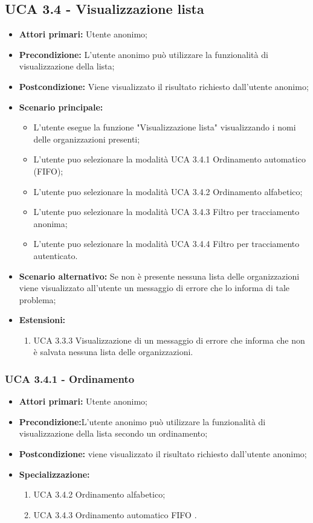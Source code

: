 \subsection{UCA 3.4 - Visualizzazione lista}%
\begin{itemize} 
	\item \textbf{Attori primari:} Utente anonimo;
	\item \textbf{Precondizione:} L’utente anonimo può utilizzare la funzionalità di visualizzazione della lista;
	\item \textbf{Postcondizione:} Viene visualizzato il risultato richiesto dall’utente anonimo;
	\item \textbf{Scenario principale:}	
	\begin{itemize}
		\item L’utente esegue la funzione "Visualizzazione lista" visualizzando i nomi delle organizzazioni presenti;
		\item L'utente puo selezionare la modalità UCA 3.4.1 Ordinamento automatico (FIFO);
		\item L'utente puo selezionare la modalità UCA 3.4.2 Ordinamento alfabetico;
		\item L'utente puo selezionare la modalità UCA 3.4.3 Filtro per tracciamento anonima;
		\item L'utente puo selezionare la modalità UCA 3.4.4 Filtro per tracciamento autenticato.
	\end{itemize}
	\item \textbf{Scenario alternativo:} Se non è presente nessuna lista delle organizzazioni viene visualizzato all’utente un messaggio di errore che lo informa di tale problema;
	\item \textbf{Estensioni:}
	\begin{enumerate}
		\item UCA 3.3.3 Visualizzazione di un messaggio di errore che informa che non è salvata nessuna lista delle organizzazioni.
	\end{enumerate}
\end{itemize}

\subsubsection{UCA 3.4.1 - Ordinamento}%
\begin{itemize}
	\item \textbf{Attori primari:} Utente anonimo;
	\item \textbf{Precondizione:}L’utente anonimo può utilizzare la funzionalità di visualizzazione della lista secondo un ordinamento;
	\item \textbf{Postcondizione:} viene visualizzato il risultato richiesto dall’utente anonimo;
	\item \textbf{Specializzazione:}
	\begin{enumerate}
		\item UCA 3.4.2 Ordinamento alfabetico;
		\item UCA 3.4.3 Ordinamento automatico FIFO .
	\end{enumerate}
\end{itemize}

